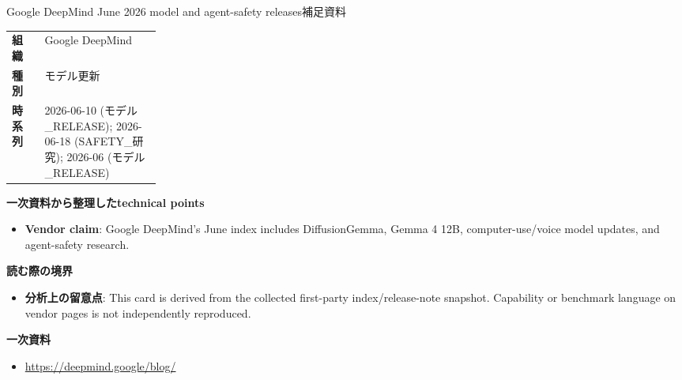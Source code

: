 \begin{technicalnote}{Google DeepMind June 2026 model and agent-safety releases}{補足資料}
\begin{tabularx}{\linewidth}{@{}>{\bfseries}p{0.22\linewidth}X@{}}
組織 & Google DeepMind \\
種別 & モデル更新 \\
時系列 & 2026-06-10 (モデル\_RELEASE); 2026-06-18 (SAFETY\_研究); 2026-06 (モデル\_RELEASE) \\
\end{tabularx}
\smallskip
{\bfseries 一次資料から整理したtechnical points}
\begin{itemize}[leftmargin=1.5em,itemsep=0.35em]
\item \textbf{Vendor claim}: Google DeepMind's June index includes DiffusionGemma, Gemma 4 12B, computer-use/voice model updates, and agent-safety research.
\end{itemize}
{\bfseries 読む際の境界}
\begin{itemize}[leftmargin=1.5em,itemsep=0.35em]
\item \textbf{分析上の留意点}: This card is derived from the collected first-party index/release-note snapshot. Capability or benchmark language on vendor pages is not independently reproduced.
\end{itemize}
{\bfseries 一次資料}
\begingroup\sloppy
\begin{itemize}[leftmargin=1.5em,itemsep=0.25em]
\item {\scriptsize\url{https://deepmind.google/blog/}}
\end{itemize}
\endgroup
\end{technicalnote}
\medskip
